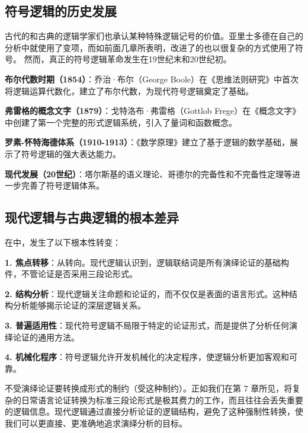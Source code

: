 \subsection{符号逻辑的历史发展}

古代的和古典的逻辑学家们也承认某种特殊逻辑记号的价值。亚里士多德在自己的分析中就使用了变项，而如前面几章所表明，改进了的也以很复杂的方式使用了符号。\cite{aristotle-logic} 然而，真正的符号逻辑革命发生在19世纪末和20世纪初。

\begin{examplebox}[title=符号逻辑发展的里程碑]
\textbf{布尔代数时期（1854）}：乔治·布尔（George Boole）在《思维法则研究》中首次将逻辑运算代数化，建立了布尔代数，为现代符号逻辑奠定了基础。

\textbf{弗雷格的概念文字（1879）}：戈特洛布·弗雷格（Gottlob Frege）在《概念文字》中创建了第一个完整的形式逻辑系统，引入了量词和函数概念。

\textbf{罗素-怀特海德体系（1910-1913）}：《数学原理》建立了基于逻辑的数学基础，展示了符号逻辑的强大表达能力。

\textbf{现代发展（20世纪）}：塔尔斯基的语义理论、哥德尔的完备性和不完备性定理等进一步完善了符号逻辑体系。
\end{examplebox}

\subsection{现代逻辑与古典逻辑的根本差异}

\begin{theorembox}[title=现代逻辑的核心特征]
在中，发生了以下根本性转变：

\textbf{1. 焦点转移}：从转向。现代逻辑认识到，逻辑联结词是所有演绎论证的基础构件，不管论证是否采用三段论形式。

\textbf{2. 结构分析}：现代逻辑关注命题和论证的，而不仅仅是表面的语言形式。这种结构分析能够揭示论证的深层逻辑关系。

\textbf{3. 普遍适用性}：现代符号逻辑不局限于特定的论证形式，而是提供了分析任何演绎论证的通用方法。

\textbf{4. 机械化程序}：符号逻辑允许开发机械化的决定程序，使逻辑分析更加客观和可靠。
\end{theorembox}

不受演绎论证要转换成形式的制约（受这种制约）。正如我们在第 7 章所见，将复杂的日常语言论证转换为标准三段论形式是极其费力的工作，而且往往会丢失重要的逻辑信息。现代逻辑通过直接分析论证的逻辑结构，避免了这种强制性转换，使我们可以更直接、更准确地追求演绎分析的目标。

